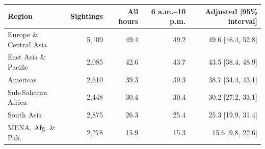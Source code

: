 \begin{tabular}{@{}lrrrr@{}}
\toprule
Region & Sightings & All hours & 6 a.m.–10 p.m. & Adjusted [95\% interval] \\
\midrule
Europe \& Central Asia & 5,109 & 49.4 & 49.2 & 49.6 [46.4, 52.8] \\
East Asia \& Pacific & 2,085 & 42.6 & 43.7 & 43.5 [38.4, 48.9] \\
Americas & 2,610 & 39.3 & 39.3 & 38.7 [34.4, 43.1] \\
Sub-Saharan Africa & 2,448 & 30.4 & 30.4 & 30.2 [27.2, 33.1] \\
South Asia & 2,875 & 26.3 & 25.4 & 25.3 [19.9, 31.4] \\
MENA, Afg. \& Pak. & 2,278 & 15.9 & 15.3 & 15.6 [9.8, 22.6] \\
\bottomrule
\end{tabular}
